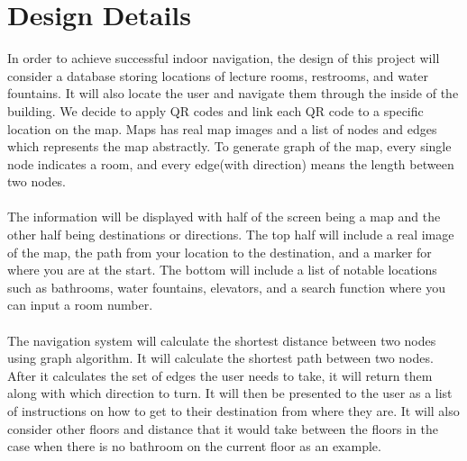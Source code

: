 \documentclass[12pt]{article}
\begin{document}
\section{Design Details}
In order to achieve successful indoor navigation, the design of this project will consider a database storing locations of lecture rooms, restrooms, and water fountains. It will also locate the user and navigate them through the inside of the building.  
We decide to apply QR codes and link each QR code to a specific location on the map. Maps has real map images and a list of nodes and edges which represents the map abstractly.  To generate graph of the map, every single node indicates a room, and every edge(with direction) means the length between two nodes. \\ \\
The information will be displayed with half of the screen being a map and the other half being destinations or directions. The top half will include a real image of the map, the path from your location to the destination, and a marker for where you are at the start. The bottom will include a list of notable locations such as bathrooms, water fountains, elevators, and a search function where you can input a room number. \\ \\
The navigation system will calculate the shortest distance between two nodes using graph algorithm. It will calculate the shortest path between two nodes. After it calculates the set of edges the user needs to take, it will return them along with which direction to turn. It will then be presented to the user as a list of instructions on how to get to their destination from where they are. It will also consider other floors and distance that it would take between the floors in the case when there is no bathroom on the current floor as an example.
\end{document}
